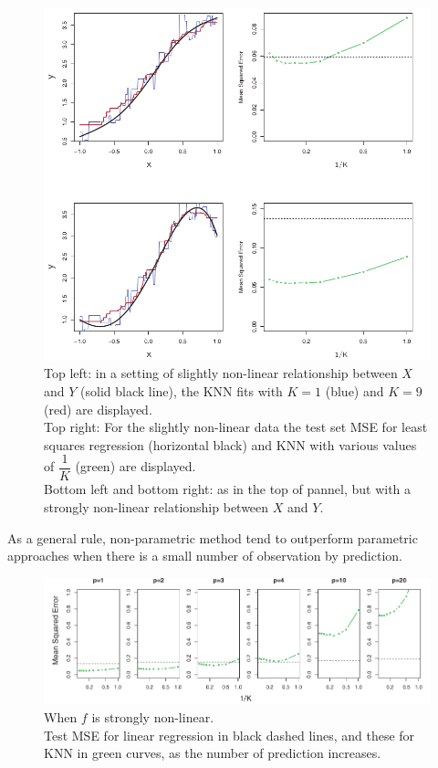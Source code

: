 \begin{figure}[H]
	\begin{center}
		\includegraphics[width=\textwidth]{./chap/1chap/2sec/5images/2_comparisonKNNlinearRegression.png}
	\end{center}
	\caption{Top left: in a setting of slightly non-linear 
	relationship between $X$ and $Y$ (solid black line), the KNN
	fits with $K=1$ (blue) and $K=9$ (red) are displayed.\\ Top
	right: For the slightly non-linear data the test set MSE for
	least squares regression (horizontal black) and KNN with 
	various values of $\dfrac{1}{K}$ (green) are displayed.\\Bottom
	left and bottom right: as in the top of pannel, but with a
	strongly non-linear relationship between $X$ and $Y$.}
	\label{fig:fig 3.1}
\end{figure}
As a general rule, non-parametric method tend to outperform parametric
approaches when there is a small number of observation by prediction.
\begin{figure}[H]
	\begin{center}
		\includegraphics[width=\textwidth]{./chap/1chap/2sec/5images/3_TestMSE.png}
	\end{center}
	\caption{When $f$ is strongly non-linear.\\
	Test MSE for linear regression in black dashed lines,
	and these for KNN in green curves, as the number of prediction
	increases.}
	\label{fig:fig 3.1}
\end{figure}
